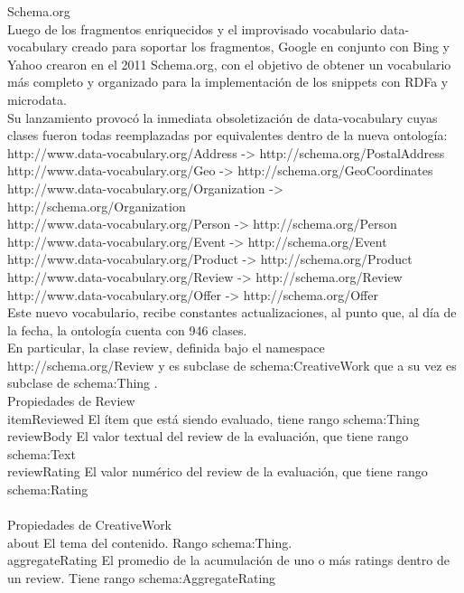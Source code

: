 Schema.org\\
Luego de los fragmentos enriquecidos y el improvisado vocabulario data-vocabulary creado para soportar los fragmentos, Google 
en conjunto con Bing y Yahoo crearon en el 2011 Schema.org, con el objetivo de obtener un vocabulario más completo y 
organizado para la implementación de los snippets con RDFa y microdata.\\
Su lanzamiento provocó la inmediata obsoletización de data-vocabulary cuyas clases fueron todas reemplazadas por equivalentes 
dentro de la nueva ontología:\\
http://www.data-vocabulary.org/Address -> http://schema.org/PostalAddress\\
http://www.data-vocabulary.org/Geo -> http://schema.org/GeoCoordinates\\
http://www.data-vocabulary.org/Organization -> http://schema.org/Organization\\
http://www.data-vocabulary.org/Person -> http://schema.org/Person\\
http://www.data-vocabulary.org/Event -> http://schema.org/Event\\
http://www.data-vocabulary.org/Product -> http://schema.org/Product\\
http://www.data-vocabulary.org/Review -> http://schema.org/Review\\
http://www.data-vocabulary.org/Offer -> http://schema.org/Offer\\
Este nuevo vocabulario, recibe constantes actualizaciones, al punto que, al día de la fecha, la ontología cuenta con 946 clases. \\
En particular, la clase review, definida bajo el namespace http://schema.org/Review y es subclase de schema:CreativeWork 
que a su vez es subclase de schema:Thing .\\
Propiedades de Review\\
itemReviewed	El ítem que está siendo evaluado, tiene rango schema:Thing \\
reviewBody 	El valor textual del review de la evaluación, que tiene rango schema:Text \\
reviewRating 	El valor numérico del review de la evaluación, que tiene rango schema:Rating \\
\\Propiedades de CreativeWork \\
about 	El tema del contenido. Rango schema:Thing. \\
aggregateRating 	El promedio de la acumulación de uno o más ratings dentro de un review. Tiene rango schema:AggregateRating \\
